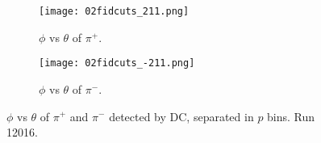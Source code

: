     \begin{figure}
        \begin{subfigure}[b]{\textwidth}
            \texttt{[image: 02fidcuts\_211.png]}
            \caption{$\phi$ vs $\theta$ of $\pi^+$.}
            \label{fig::20.02::fiducial_cuts_pid211}
        \end{subfigure}
        \begin{subfigure}[b]{\textwidth}
            \texttt{[image: 02fidcuts\_-211.png]}
            \caption{$\phi$ vs $\theta$ of $\pi^-$.}
            \label{fig::20.02::fiducial_cuts_pid-211}
        \end{subfigure}

        \caption[$\phi$ vs $\theta$ of $\pi^+$ and $\pi^-$, separated in $p$ bins.]
        {$\phi$ vs $\theta$ of $\pi^+$ and $\pi^-$ detected by DC, separated in $p$ bins.
        Run 12016.}
        \label{fig::20.02::fiducial_cuts_pions}
    \end{figure}
